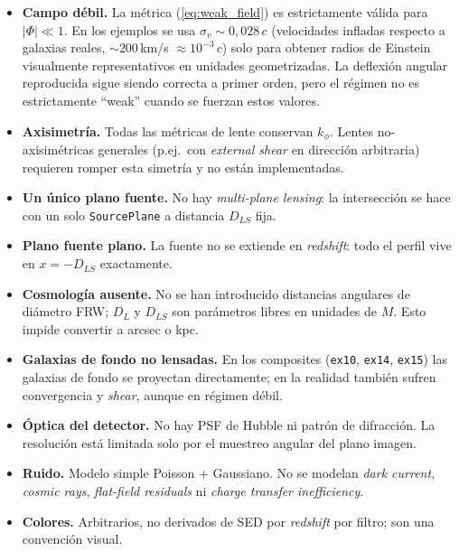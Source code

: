 \documentclass[11pt,a4paper]{article}
\begin{document}
\begin{itemize}
  \item \textbf{Campo débil.} La métrica (\ref{eq:weak_field}) es
        estrictamente válida para $|\Phi| \ll 1$. En los ejemplos se usa
        $\sigma_v \sim 0{,}028\,c$ (velocidades infladas respecto a
        galaxias reales, $\sim 200$\,km/s $\approx 10^{-3}\,c$) solo
        para obtener radios de Einstein visualmente representativos en
        unidades geometrizadas. La deflexión angular reproducida sigue
        siendo correcta a primer orden, pero el régimen no es
        estrictamente ``weak'' cuando se fuerzan estos valores.
  \item \textbf{Axisimetría.} Todas las métricas de lente conservan
        $k_\phi$. Lentes no-axisimétricas generales (p.ej.\ con
        \emph{external shear} en dirección arbitraria) requieren romper
        esta simetría y no están implementadas.
  \item \textbf{Un único plano fuente.} No hay \emph{multi-plane
        lensing}: la intersección se hace con un solo
        \texttt{SourcePlane} a distancia $D_{LS}$ fija.
  \item \textbf{Plano fuente plano.} La fuente no se extiende en
        \emph{redshift}: todo el perfil vive en $x = -D_{LS}$ exactamente.
  \item \textbf{Cosmología ausente.} No se han introducido distancias
        angulares de diámetro FRW; $D_L$ y $D_{LS}$ son parámetros libres
        en unidades de $M$. Esto impide convertir a arcsec o kpc.
  \item \textbf{Galaxias de fondo no lensadas.} En los composites
        (\texttt{ex10}, \texttt{ex14}, \texttt{ex15}) las galaxias de
        fondo se proyectan directamente; en la realidad también sufren
        convergencia y \emph{shear}, aunque en régimen débil.
  \item \textbf{Óptica del detector.} No hay PSF de Hubble ni patrón de
        difracción. La resolución está limitada solo por el muestreo
        angular del plano imagen.
  \item \textbf{Ruido.} Modelo simple Poisson + Gaussiano. No se
        modelan \emph{dark current}, \emph{cosmic rays}, \emph{flat-field
        residuals} ni \emph{charge transfer inefficiency}.
  \item \textbf{Colores.} Arbitrarios, no derivados de SED por
        \emph{redshift} por filtro; son una convención visual.
\end{itemize}
\end{document}
